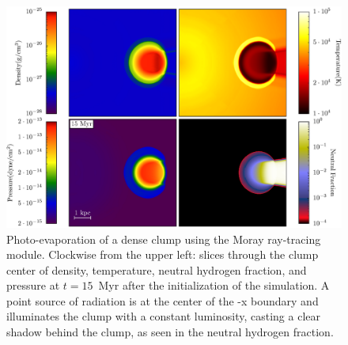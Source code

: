 \begin{figure}
  \centering
  \includegraphics[width=1.0\textwidth]{figures/code-test-shadowing.eps}
  \caption{Photo-evaporation of a dense clump using the Moray
ray-tracing module.  Clockwise from the upper left: slices
through the clump center of density, temperature, neutral hydrogen
fraction, and pressure at $t=15$~Myr after the initialization of the
simulation.  A point source of radiation is at the center of the -x
boundary and illuminates the clump with a constant luminosity, casting
a clear shadow behind the clump, as seen in the neutral hydrogen
fraction.}
  \label{fig:shadowing}
\end{figure}
